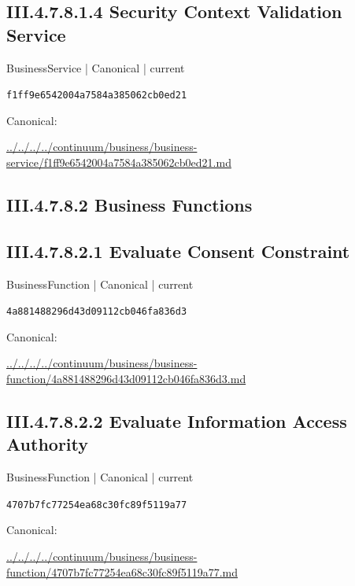 \documentclass[10pt,a4paper]{article}
\begin{document}
\subsection*{III.4.7.8.1.4 Security Context Validation Service}
\label{element-f1ff9e6542004a7584a385062cb0ed21}
{\small BusinessService | Canonical | current}\par
\texttt{f1ff9e6542004a7584a385062cb0ed21}\par
Canonical: \par
{\footnotesize\url{../../../../continuum/business/business-service/f1ff9e6542004a7584a385062cb0ed21.md}}\par
\subsection*{III.4.7.8.2 Business Functions}
\subsection*{III.4.7.8.2.1 Evaluate Consent Constraint}
\label{element-4a881488296d43d09112cb046fa836d3}
{\small BusinessFunction | Canonical | current}\par
\texttt{4a881488296d43d09112cb046fa836d3}\par
Canonical: \par
{\footnotesize\url{../../../../continuum/business/business-function/4a881488296d43d09112cb046fa836d3.md}}\par
\subsection*{III.4.7.8.2.2 Evaluate Information Access Authority}
\label{element-4707b7fc77254ea68c30fc89f5119a77}
{\small BusinessFunction | Canonical | current}\par
\texttt{4707b7fc77254ea68c30fc89f5119a77}\par
Canonical: \par
{\footnotesize\url{../../../../continuum/business/business-function/4707b7fc77254ea68c30fc89f5119a77.md}}\par
\end{document}
